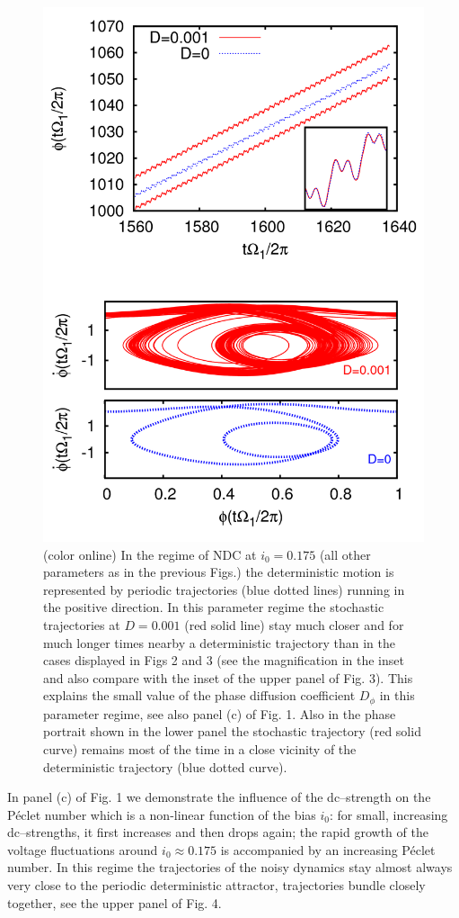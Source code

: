 \documentclass[a4,twocolumn,showpacs,showkeys]{revtex4}
\begin{document}
\begin{figure}
\includegraphics[width=1\linewidth]{fig4} 
\caption{(color online)  
In the regime of NDC at $i_0=0.175$ (all other parameters as in the
previous Figs.) the deterministic motion is represented by 
periodic trajectories (blue dotted lines) running in the positive
direction. 
In this parameter regime the stochastic trajectories at $D=0.001$ (red
solid line) stay much closer 
and for much longer times nearby a deterministic trajectory than in the
cases displayed in Figs 2 and 3 (see the magnification in the inset and 
also compare with the
inset of the upper panel of Fig. 3). This
explains the small value of the phase diffusion coefficient $D_{\phi}$
in this parameter regime, see also panel (c) of Fig. 1. Also in the phase
portrait shown in the lower panel the stochastic
trajectory (red solid curve)  remains most of the time in a close
vicinity of the deterministic trajectory (blue dotted curve).  
}
\label{fig4}
\end{figure}
In panel (c) of Fig. 1 we demonstrate the influence of the dc--strength 
on the P\'eclet number which  is a non-linear function of the
bias $i_0$:   for small, increasing dc--strengths,
it first increases and then 
drops again; the rapid growth of the voltage fluctuations around
$i_{0} \approx 0.175$ is accompanied
by an increasing  P\'eclet number.  In this regime the
trajectories of the noisy dynamics stay almost always very close to the
periodic deterministic attractor, trajectories bundle closely together, 
see the upper panel of Fig. 4.
\end{document}
